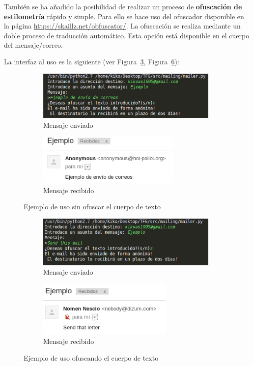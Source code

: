 También se ha añadido la posibilidad de realizar un proceso de \textbf{ofuscación de estilometría} rápido y simple. Para ello se hace uso del ofuscador disponible en la página \url{https://skaillz.net/obfuscator/}. La ofuscación se realiza mediante un doble proceso de traducción automático. 
Esta opción está disponible en el cuerpo del mensaje/correo.

La interfaz al uso es la siguiente (ver Figura~\ref{fig:mailer}, Figura~\ref{fig:mailer2}):

\begin{figure}[H]
	\centering
	\begin{subfigure}{0.5\textwidth}
		\centering
		\mbox{\includegraphics[width=3.50in]{images/sin_ofuscar.png}}
		\caption{Mensaje enviado}
		\label{fig:sub1}
	\end{subfigure}%
	\begin{subfigure}{0.5\textwidth}
		\centering
		\mbox{\includegraphics[width=2.75in]{images/recibido_sin.png}}
		\caption{Mensaje recibido}
		\label{fig:sub2}
	\end{subfigure}
	\caption{Ejemplo de uso sin ofuscar el cuerpo de texto}
	\label{fig:mailer}
\end{figure}

\begin{figure}[H]
	\centering
	\begin{subfigure}{0.5\textwidth}
		\centering
		\mbox{\includegraphics[width=3.50in]{images/con_ofuscar.png}}
		\caption{Mensaje enviado}
		\label{fig:sub3}
	\end{subfigure}%
	\begin{subfigure}{0.5\textwidth}
		\centering
		\mbox{\includegraphics[width=2.6in]{images/recibido_con.png}}
		\caption{Mensaje recibido}
		\label{fig:sub4}
	\end{subfigure}
	\caption{Ejemplo de uso ofuscando el cuerpo de texto}
	\label{fig:mailer2}
\end{figure}

